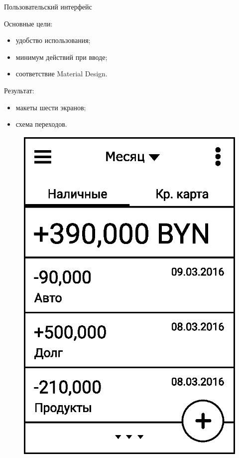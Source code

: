 \documentclass[hyperref={pdftex,unicode}]{beamer}
\begin{document}
\begin{frame}{Пользовательский интерфейс}
  \begin{minipage}{0.55\linewidth}
    Основные цели:
    \begin{itemize}
    \item удобство использования;
    \item минимум действий при вводе;
    \item соответствие Material Design.
    \end{itemize}

    Результат:
    \begin{itemize}
    \item макеты шести экранов;
    \item схема переходов.
    \end{itemize}
  \end{minipage}
  \hfill
  \begin{minipage}{0.35\linewidth}
    \begin{figure}[h!]
      \centering
      \includegraphics[width=\textwidth]{fig/ui_activities_balance_text_chrono.eps}
    \end{figure}
  \end{minipage}
\end{frame}
\end{document}
